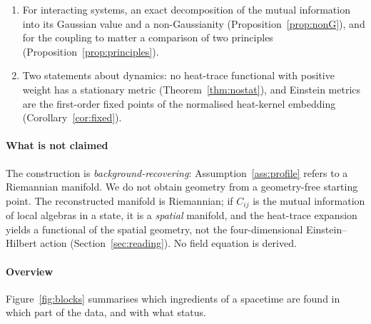 \documentclass[11pt,a4paper]{article}
\theoremstyle{stmt}
\theoremstyle{defn}
\theoremstyle{rmk}
\numberwithin{equation}{section}
\begin{document}
\begin{enumerate}
\item For interacting systems, an exact decomposition of the mutual information into its Gaussian value and a non-Gaussianity (Proposition~\ref{prop:nonG}), and for the coupling to matter a comparison of two principles (Proposition~\ref{prop:principles}).
\item Two statements about dynamics: no heat-trace functional with positive weight has a stationary metric (Theorem~\ref{thm:nostat}), and Einstein metrics are the first-order fixed points of the normalised heat-kernel embedding (Corollary~\ref{cor:fixed}).
\end{enumerate}

\paragraph{What is not claimed} The construction is \emph{background-recovering}: Assumption~\ref{ass:profile} refers to a Riemannian manifold. We do not obtain geometry from a geometry-free starting point. The reconstructed manifold is Riemannian; if $C_{ij}$ is the mutual information of local algebras in a state, it is a \emph{spatial} manifold, and the heat-trace expansion yields a functional of the spatial geometry, not the four-dimensional Einstein--Hilbert action (Section~\ref{sec:reading}). No field equation is derived.

\paragraph{Overview} Figure~\ref{fig:blocks} summarises which ingredients of a spacetime are found in which part of the data, and with what status.
\end{document}
